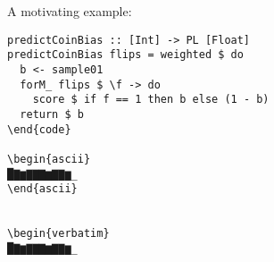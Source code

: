 \documentclass{beamer}
\newenvironment{code}{\VerbatimEnvironment \begin{verbatim}}{\end{verbatim}}
\newenvironment{ascii}{\VerbatimEnvironment \begin{verbatim}}{\end{verbatim}}
\begin{document}
\begin{comment}
\begin{code}
{-# LANGUAGE RecordWildCards #-}
{-# LANGUAGE ApplicativeDo #-}
{-# LANGUAGE GeneralizedNewtypeDeriving #-}
{-# LANGUAGE GADTs #-}
{-# LANGUAGE StandaloneDeriving #-}
{-# LANGUAGE FlexibleContexts #-}
{-# LANGUAGE FlexibleInstances #-}
{-# LANGUAGE UndecidableInstances #-}
{-# LANGUAGE DeriveFunctor #-}
{-# LANGUAGE BangPatterns #-}
{-# LANGUAGE MagicHash #-}
import System.Random
import System.Environment (getArgs)
import Debug.Trace
import Control.Applicative
import Data.List(sort, nub)
import Data.Proxy
import Control.Monad (replicateM)
import Data.Monoid hiding(Ap)
import Control.Monad
import Data.Bits
import GHC.Float
import GHC.Exts
import qualified Data.Map as M
\end{code}
\end{comment}

A motivating example:


\begin{code}
predictCoinBias :: [Int] -> PL [Float]
predictCoinBias flips = weighted $ do
  b <- sample01
  forM_ flips $ \f -> do
    score $ if f == 1 then b else (1 - b)
  return $ b
\end{code}

\begin{ascii}
█▇▆▇▇▇▆▇▇▆_
\end{ascii}


\begin{verbatim}
█▇▆▇▇▇▆▇▇▆_
\end{verbatim}

\end{document}
